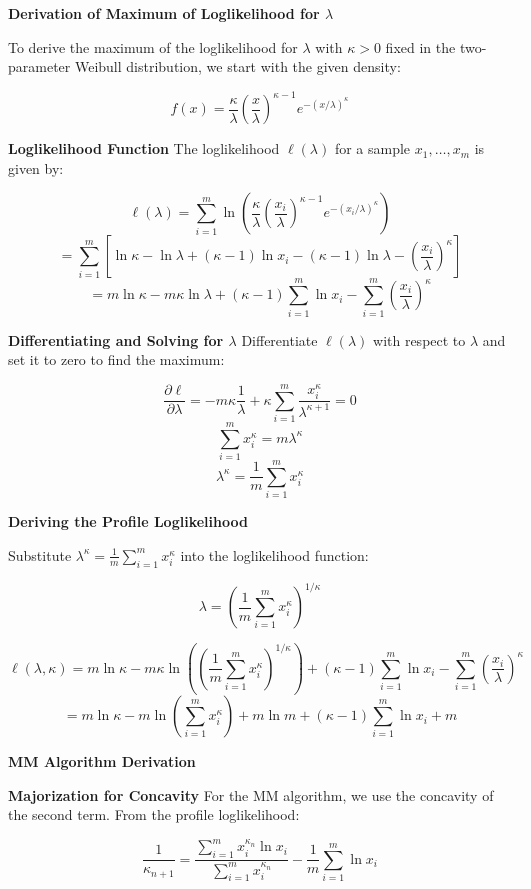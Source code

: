 \documentclass[8pt]{article}
\begin{document}
{\textbf{Derivation of Maximum of Loglikelihood for \(\lambda\)}

To derive the maximum of the loglikelihood for \(\lambda\) with \(\kappa > 0\) fixed in the two-parameter Weibull distribution, we start with the given density:

\[
f(x) = \frac{\kappa}{\lambda} \left( \frac{x}{\lambda} \right)^{\kappa - 1} e^{-(x / \lambda)^\kappa}
\]

\textbf{Loglikelihood Function}
The loglikelihood \(\ell(\lambda)\) for a sample \(x_1, \ldots, x_m\) is given by:

\[
\ell(\lambda) = \sum_{i=1}^m \ln \left( \frac{\kappa}{\lambda} \left( \frac{x_i}{\lambda} \right)^{\kappa - 1} e^{-(x_i / \lambda)^\kappa} \right)
\]
\[
= \sum_{i=1}^m \left[ \ln \kappa - \ln \lambda + (\kappa - 1) \ln x_i - (\kappa - 1) \ln \lambda - \left(\frac{x_i}{\lambda}\right)^\kappa \right]
\]
\[
= m \ln \kappa - m \kappa \ln \lambda + (\kappa - 1) \sum_{i=1}^m \ln x_i - \sum_{i=1}^m \left(\frac{x_i}{\lambda}\right)^\kappa
\]

\textbf{Differentiating and Solving for \(\lambda\)}
Differentiate \(\ell(\lambda)\) with respect to \(\lambda\) and set it to zero to find the maximum:

\[
\frac{\partial \ell}{\partial \lambda} = -m \kappa \frac{1}{\lambda} + \kappa \sum_{i=1}^m \frac{x_i^\kappa}{\lambda^{\kappa + 1}} = 0
\]
\[
\sum_{i=1}^m x_i^\kappa = m \lambda^\kappa
\]
\[
\lambda^\kappa = \frac{1}{m} \sum_{i=1}^m x_i^\kappa
\]

\textbf{Deriving the Profile Loglikelihood}

Substitute \(\lambda^\kappa = \frac{1}{m} \sum_{i=1}^m x_i^\kappa\) into the loglikelihood function:

\[
\lambda = \left(\frac{1}{m} \sum_{i=1}^m x_i^\kappa\right)^{1/\kappa}
\]

\[
\ell(\lambda, \kappa) = m \ln \kappa - m \kappa \ln \left( \left(\frac{1}{m} \sum_{i=1}^m x_i^\kappa\right)^{1/\kappa} \right) + (\kappa - 1) \sum_{i=1}^m \ln x_i - \sum_{i=1}^m \left(\frac{x_i}{\lambda}\right)^\kappa
\]
\[
= m \ln \kappa - m \ln \left( \sum_{i=1}^m x_i^\kappa \right) + m \ln m + (\kappa - 1) \sum_{i=1}^m \ln x_i + m
\]

\textbf{MM Algorithm Derivation}

\textbf{Majorization for Concavity}
For the MM algorithm, we use the concavity of the second term. From the profile loglikelihood:

\[
\frac{1}{\kappa_{n+1}} = \frac{\sum_{i=1}^m x_i^{\kappa_n} \ln x_i}{\sum_{i=1}^m x_i^{\kappa_n}} - \frac{1}{m} \sum_{i=1}^m \ln x_i
\]

}
\end{document}
